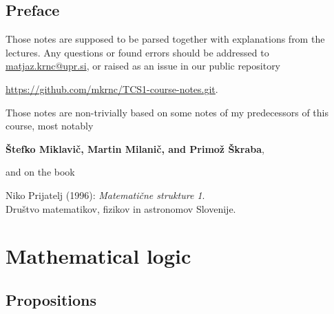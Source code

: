 \documentclass[11pt,paper=b5,footinclude,headinclude]{scrbook} %
\theoremstyle{remark}
\theoremstyle{definition} %
\theoremstyle{theorem} %
\newcommand{\myAuthors}{Štefko Miklavič, Martin Milanič, and Primož Škraba}
\newcommand{\myRepo}{\url{https://github.com/mkrnc/TCS1-course-notes.git}}
\begin{document}


\newpage
\section*{Preface}
   

Those notes are supposed to be parsed together with explanations from the lectures.
Any questions or found errors should be 
addressed to \url{matjaz.krnc@upr.si}, or 
raised as an issue in our public repository 
\begin{center}
    \myRepo.    
\end{center}

\medskip
Those notes are non-trivially based on some notes of my predecessors of this course, most notably 
\begin{center}
    \textbf{\myAuthors},
\end{center}
and on the book
\begin{center}
   Niko Prijatelj (1996):
   \emph{Matematične strukture 1}.
   \\
   Društvo   matematikov,   fizikov in astronomov Slovenije. 
\end{center}





\tableofcontents

\chapter{Mathematical logic}
\section{Propositions}
\end{document}
